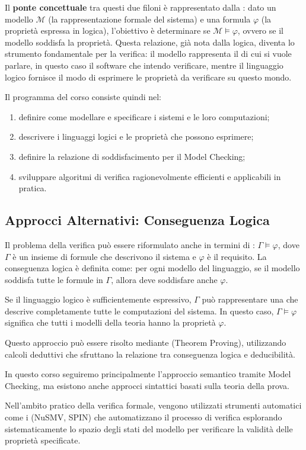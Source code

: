 Il \textbf{ponte concettuale} tra questi due filoni è rappresentato dalla : dato un modello \(\mathcal{M}\) (la rappresentazione formale del sistema) e una formula \(\varphi\) (la proprietà espressa in logica), l'obiettivo è determinare se \(\mathcal{M} \models \varphi\), ovvero se il modello soddisfa la proprietà.
Questa relazione, già nota dalla logica, diventa lo strumento fondamentale per la verifica: il modello rappresenta il  di cui si vuole parlare, in questo caso il software che intendo verificare, mentre il linguaggio logico fornisce il modo di esprimere le proprietà da verificare su questo mondo.

Il programma del corso consiste quindi nel:
\begin{enumerate}
  \item definire come modellare e specificare i sistemi e le loro computazioni;
  \item descrivere i linguaggi logici e le proprietà che possono esprimere;
  \item definire la relazione di soddisfacimento per il Model Checking;
  \item sviluppare algoritmi di verifica ragionevolmente efficienti e applicabili in pratica.
\end{enumerate}

\subsection*{Approcci Alternativi: Conseguenza Logica}

Il problema della verifica può essere riformulato anche in termini di : \(\Gamma \models \varphi\), dove \(\Gamma\) è un insieme di formule che descrivono il sistema e \(\varphi\) è il requisito.
La conseguenza logica è definita come: per ogni modello del linguaggio, se il modello soddisfa tutte le formule in \(\Gamma\), allora deve soddisfare anche \(\varphi\).

Se il linguaggio logico è sufficientemente espressivo, \(\Gamma\) può rappresentare una  che descrive completamente tutte le computazioni del sistema. In questo caso, \(\Gamma \models \varphi\) significa che tutti i modelli della teoria hanno la proprietà \(\varphi\).

Questo approccio può essere risolto mediante  (Theorem Proving), utilizzando calcoli deduttivi che sfruttano la relazione tra conseguenza logica e deducibilità.

\begin{note}
  In questo corso seguiremo principalmente l'approccio semantico tramite Model Checking, ma esistono anche approcci sintattici basati sulla teoria della prova.
\end{note}

Nell'ambito pratico della verifica formale, vengono utilizzati strumenti automatici come i  (NuSMV, SPIN) che automatizzano il processo di verifica esplorando sistematicamente lo spazio degli stati del modello per verificare la validità delle proprietà specificate.